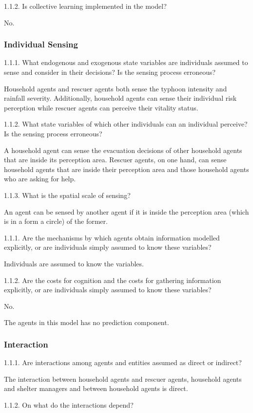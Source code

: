 \documentclass[runningheads]{llncs}
\begin{document}
1.1.2.	Is collective learning implemented in the model?

No.

\subsubsection{Individual Sensing}
1.1.1.	What endogenous and exogenous state variables are individuals assumed to sense and consider in their decisions? Is the sensing process erroneous?

Household agents and rescuer agents both sense the typhoon intensity and rainfall severity. Additionally, household agents can sense their individual risk perception while rescuer agents can perceive their vitality status.  
 
1.1.2.	What state variables of which other individuals can an individual perceive? Is the sensing process erroneous?

A household agent can sense the evacuation decisions of other household agents that are inside its perception area. Rescuer agents, on one hand, can sense household agents that are inside their perception area and those household agents who are asking for help.

1.1.3.	What is the spatial scale of sensing?

An agent can be sensed by another agent if it is inside the perception area (which is in a form a circle) of the former.

1.1.1.	Are the mechanisms by which agents obtain information modelled explicitly, or are individuals simply assumed to know these variables?

Individuals are assumed to know the variables.

1.1.2.	Are the costs for cognition and the costs for gathering information explicitly, or are individuals simply assumed to know these variables?

No.

The agents in this model has no prediction component.

\subsubsection{Interaction}
1.1.1.	Are interactions among agents and entities assumed as direct or indirect?

The interaction between household agents and rescuer agents, household agents and shelter managers and between household agents is direct.

1.1.2.	On what do the interactions depend?
\end{document}
